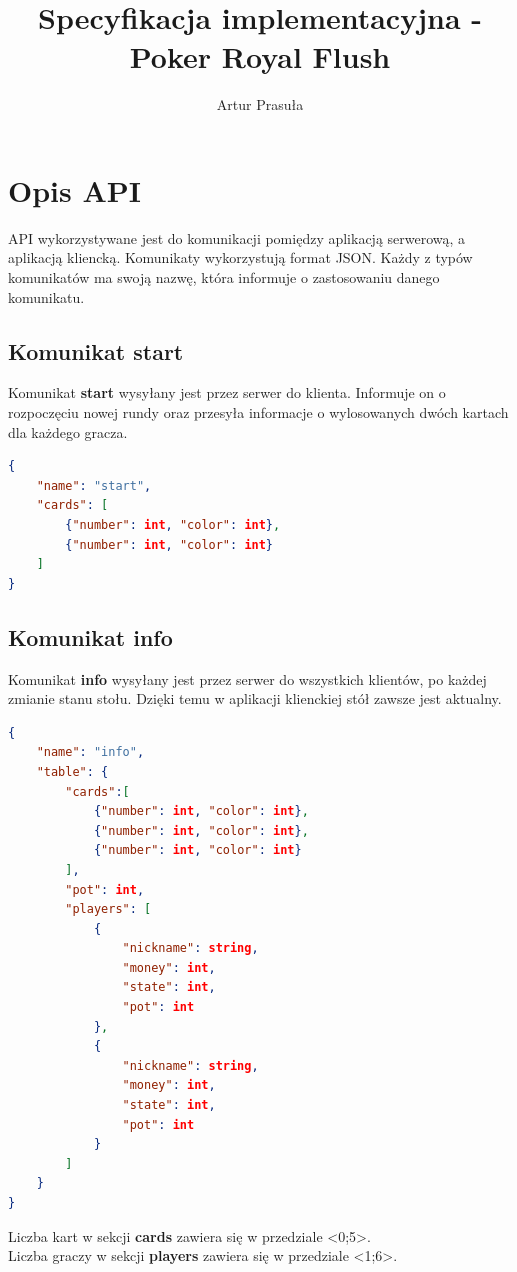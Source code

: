 \documentclass{article}
\title{Specyfikacja implementacyjna - Poker Royal Flush}
\author{Artur Prasuła}
\begin{document}
\maketitle
\tableofcontents
\newpage


\section{Opis API} %
    API wykorzystywane jest do komunikacji pomiędzy aplikacją serwerową, a aplikacją kliencką.
    Komunikaty wykorzystują format JSON. Każdy z typów komunikatów ma swoją nazwę, która informuje o zastosowaniu danego komunikatu.
    
    \subsection{Komunikat start}
        Komunikat \textbf{start} wysyłany jest przez serwer do klienta.
        Informuje on o rozpoczęciu nowej rundy oraz przesyła informacje o wylosowanych dwóch kartach dla każdego gracza.
        \begin{lstlisting}[language=json,firstnumber=1]
{
    "name": "start",
    "cards": [
        {"number": int, "color": int},
        {"number": int, "color": int}
    ]
}
        \end{lstlisting}
    
    \subsection{Komunikat info}
        Komunikat \textbf{info} wysyłany jest przez serwer do wszystkich klientów, po każdej zmianie stanu stołu.
        Dzięki temu w aplikacji klienckiej stół zawsze jest aktualny.
    
        \begin{lstlisting}[language=json,firstnumber=1]
{
    "name": "info",
    "table": {
        "cards":[
            {"number": int, "color": int},
            {"number": int, "color": int},
            {"number": int, "color": int}
        ],
        "pot": int,
        "players": [
            {
                "nickname": string,
                "money": int,
                "state": int,
                "pot": int
            },
            {
                "nickname": string,
                "money": int,
                "state": int,
                "pot": int
            }
        ]
    }
}
    \end{lstlisting}
    Liczba kart w sekcji \textbf{cards} zawiera się w przedziale <0;5>.\\
    Liczba graczy w sekcji \textbf{players} zawiera się w przedziale <1;6>.
    
\end{document}
